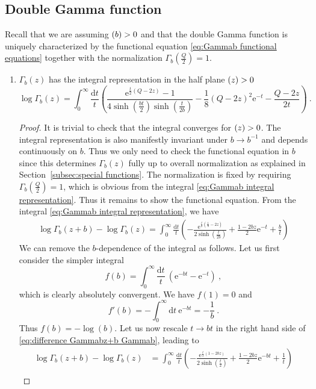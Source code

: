 \documentclass[12pt,a4paper]{article}
\newcommand{\be}{\begin{equation}}
\newcommand{\ee}{\end{equation}}
\let\Re\relax
\DeclareMathOperator\Re{Re}
\begin{document}
\subsection{Double Gamma function}
Recall that we are assuming $\Re(b)>0$ and that the double Gamma function is uniquely characterized by the functional equation \eqref{eq:Gammab functional equations} together with the normalization $\Gamma_b(\frac{Q}{2})=1$.
\begin{enumerate}
    \item $\Gamma_b(z)$ has the integral representation in the half plane $\Re(z)>0$
    \be  
        \log \Gamma_b(z)=\int_0^\infty \frac{\mathrm{d}t}{t}\left(\frac{\mathrm{e}^{\frac{t}{2}(Q-2z)}-1}{4 \sinh(\frac{bt}{2})\sinh(\frac{t}{2b})}-\frac{1}{8}\left(Q-2z\right)^2 \mathrm{e}^{-t}-\frac{Q-2z}{2t}\right)\ . \label{eq:Gammab integral representation}
    \ee
    \begin{proof}
    It is trivial to check that the integral converges for $\Re(z)>0$.
    The integral representation is also manifestly invariant under $b \to b^{-1}$ and depends continuously on $b$. Thus we only need to check the functional equation in $b$ since this determines $\Gamma_b(z)$ fully up to overall normalization as explained in Section~\ref{subsec:special functions}. The normalization is fixed by requiring $\Gamma_b(\frac{Q}{2})=1$, which is obvious from the integral \eqref{eq:Gammab integral representation}.
    Thus it remains to show the functional equation. From the integral \eqref{eq:Gammab integral representation}, we have
    \begin{align}
        \log \Gamma_b(z+b)-\log \Gamma_b(z)=\int_0^\infty \frac{\mathrm{d}t}{t} \left(-\frac{\mathrm{e}^{\frac{t}{2}(\frac{1}{b}-2z)}}{2 \sinh(\frac{t}{2b})}+\frac{1-2b z}{2} \mathrm{e}^{-t}+\frac{b}{t}\right) \label{eq:difference Gammabz+b Gammab}
    \end{align}
    We can remove the $b$-dependence of the integral as follows. Let us first consider the simpler integral
    \be  
        f(b)=\int_0^\infty \frac{\mathrm{d}t}{t} \ \left(\mathrm{e}^{-b t}-\mathrm{e}^{-t}\right)\ , \label{eq:f integral}
    \ee
    which is clearly absolutely convergent. We have $f(1)=0$ and
    \be  
        f'(b)=-\int_0^\infty\!\! \mathrm{d}t\ \mathrm{e}^{-b t}=-\frac{1}{b}\ .
    \ee
    Thus $f(b)=-\log(b)$.
    Let us now rescale $t \to bt$ in the right hand side of \eqref{eq:difference Gammabz+b Gammab}, leading to
    \begin{align}  
        \log \Gamma_b(z+b)-\log \Gamma_b(z)&=\int_0^\infty \frac{\mathrm{d}t}{t} \left(-\frac{\mathrm{e}^{\frac{t}{2}(1-2bz)}}{2 \sinh(\frac{t}{2})}+\frac{1-2b z}{2} \mathrm{e}^{-bt}+\frac{1}{t}\right) \\

\end{align}
\end{proof}
\end{enumerate}
\end{document}
